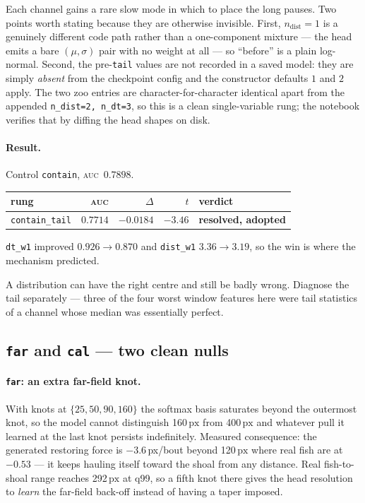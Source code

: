 \documentclass[11pt,a4paper]{article}
\newcommand{\uu}[1]{\ensuremath{\,\mathrm{#1}}}  %
\newcommand{\win}[1]{\textcolor{winc}{\textbf{#1}}}
\newcommand{\auc}{\textsc{auc}}
\newcommand{\code}[1]{\texttt{\small #1}}
\begin{document}
\noindent Each channel gains a rare slow mode in which to place the long pauses. Two points
worth stating because they are otherwise invisible. First, $n_{\mathrm{dist}} = 1$ is a
genuinely different code path rather than a one-component mixture --- the head emits a bare
$(\mu,\sigma)$ pair with no weight at all --- so ``before'' is a plain log-normal. Second,
the pre-\code{tail} values are not recorded in a saved model: they are simply \emph{absent}
from the checkpoint config and the constructor defaults $1$ and $2$ apply. The two zoo
entries are character-for-character identical apart from the appended
\code{n\_dist=2, n\_dt=3}, so this is a clean single-variable rung; the notebook verifies
that by diffing the head shapes on disk.

\paragraph{Result.} Control \code{contain}, \auc\ $0.7898$.
\begin{center}\small
\begin{tabular}{lrrrl}
\toprule
rung & \auc{} & $\Delta$ & $t$ & verdict \\
\midrule
\code{contain\_tail} & $\mathbf{0.7714}$ & $\mathbf{-0.0184}$ & $-3.46$ & \win{resolved, adopted} \\
\bottomrule
\end{tabular}
\end{center}
\code{dt\_w1} improved $0.926 \to 0.870$ and \code{dist\_w1} $3.36 \to 3.19$, so the win is
where the mechanism predicted.

\begin{takeaway}
A distribution can have the right centre and still be badly wrong. Diagnose the tail
separately --- three of the four worst window features here were tail statistics of a
channel whose median was essentially perfect.
\end{takeaway}

\subsection{\texttt{far} and \texttt{cal} --- two clean nulls}

\paragraph{\texttt{far}: an extra far-field knot.}
With knots at $\{25,50,90,160\}$ the softmax basis saturates beyond the outermost knot, so
the model cannot distinguish 160\uu{px} from 400\uu{px} and whatever pull it learned
at the last knot persists indefinitely. Measured consequence: the generated restoring
force is $-3.6$\,px/bout beyond 120\uu{px} where real fish are at $-0.53$ --- it keeps
hauling itself toward the shoal from any distance. Real fish-to-shoal range reaches
292\uu{px} at q99, so a fifth knot there gives the head resolution to \emph{learn} the
far-field back-off instead of having a taper imposed.
\end{document}
